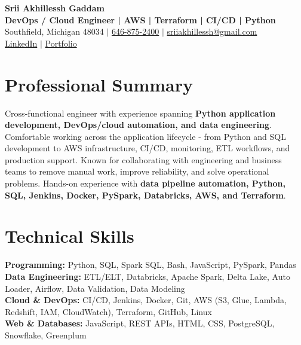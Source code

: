 \documentclass[letterpaper,10pt]{article}
\begin{document}
\fontsize{9.35pt}{10.45pt}\selectfont

\begin{center}
    {\LARGE \textbf{Srii Akhillessh Gaddam}} \\[-1pt]
    \textbf{DevOps / Cloud Engineer | AWS | Terraform | CI/CD | Python} \\[2pt]
    Southfield, Michigan 48034 $|$
    \href{tel:6468752400}{646-875-2400} $|$
    \href{mailto:sriiakhillessh@gmail.com}{sriiakhillessh@gmail.com} \\[1pt]
    \href{https://www.linkedin.com/in/srii-akhiilessh-gaddam-b48668191/}{LinkedIn} $|$
    \href{https://sriiakhillesshg.github.io/portfolio/}{Portfolio}
\end{center}
\vspace{-8pt}

\section{Professional Summary}
\small{Cross-functional engineer with experience spanning \textbf{Python application development, DevOps/cloud automation, and data engineering}. Comfortable working across the application lifecycle - from Python and SQL development to AWS infrastructure, CI/CD, monitoring, ETL workflows, and production support. Known for collaborating with engineering and business teams to remove manual work, improve reliability, and solve operational problems. Hands-on experience with \textbf{data pipeline automation, Python, SQL, Jenkins, Docker, PySpark, Databricks, AWS, and Terraform}.}

\section{Technical Skills}
\small{
\textbf{Programming:} Python, SQL, Spark SQL, Bash, JavaScript, PySpark, Pandas \\
\textbf{Data Engineering:} ETL/ELT, Databricks, Apache Spark, Delta Lake, Auto Loader, Airflow, Data Validation, Data Modeling \\
\textbf{Cloud \& DevOps:} CI/CD, Jenkins, Docker, Git, AWS (S3, Glue, Lambda, Redshift, IAM, CloudWatch), Terraform, GitHub, Linux \\
\textbf{Web \& Databases:} JavaScript, REST APIs, HTML, CSS, PostgreSQL, Snowflake, Greenplum
}
\end{document}
